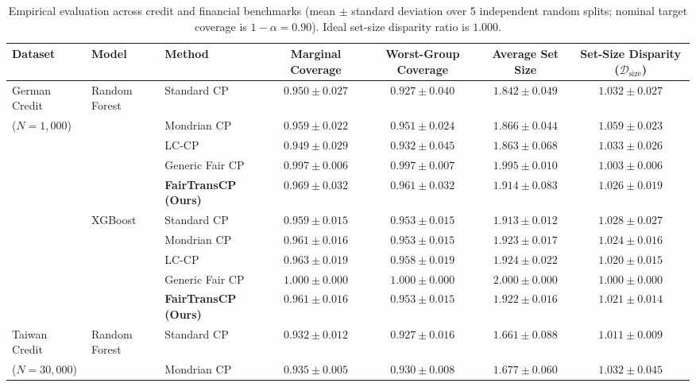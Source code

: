 \documentclass[conference]{IEEEtran}
\begin{document}
\begin{table}[t]
\centering
\caption{Empirical evaluation across credit and financial benchmarks (mean $\pm$ standard deviation over 5 independent random splits; nominal target coverage is $1 - \alpha = 0.90$). Ideal set-size disparity ratio is $1.000$.}
\label{tab:main_results}
\begin{tabular}{lllcccc}
\toprule
\textbf{Dataset} & \textbf{Model} & \textbf{Method} & \textbf{Marginal Coverage} & \textbf{Worst-Group Coverage} & \textbf{Average Set Size} & \textbf{Set-Size Disparity ($\mathcal{D}_{\text{size}}$)} \\
\midrule
German Credit & Random Forest & Standard CP & $0.950 \pm 0.027$ & $0.927 \pm 0.040$ & $1.842 \pm 0.049$ & $1.032 \pm 0.027$ \\
($N=1{,}000$) & & Mondrian CP & $0.959 \pm 0.022$ & $0.951 \pm 0.024$ & $1.866 \pm 0.044$ & $1.059 \pm 0.023$ \\
& & LC-CP & $0.949 \pm 0.029$ & $0.932 \pm 0.045$ & $1.863 \pm 0.068$ & $1.033 \pm 0.026$ \\
& & Generic Fair CP & $0.997 \pm 0.006$ & $0.997 \pm 0.007$ & $1.995 \pm 0.010$ & $\mathbf{1.003 \pm 0.006}$ \\
& & \textbf{FairTransCP (Ours)} & $\mathbf{0.969 \pm 0.032}$ & $\mathbf{0.961 \pm 0.032}$ & $\mathbf{1.914 \pm 0.083}$ & $\mathbf{1.026 \pm 0.019}$ \\
\cmidrule{2-7}
& XGBoost & Standard CP & $0.959 \pm 0.015$ & $0.953 \pm 0.015$ & $1.913 \pm 0.012$ & $1.028 \pm 0.027$ \\
& & Mondrian CP & $0.961 \pm 0.016$ & $0.953 \pm 0.015$ & $1.923 \pm 0.017$ & $1.024 \pm 0.016$ \\
& & LC-CP & $0.963 \pm 0.019$ & $0.958 \pm 0.019$ & $1.924 \pm 0.022$ & $1.020 \pm 0.015$ \\
& & Generic Fair CP & $1.000 \pm 0.000$ & $1.000 \pm 0.000$ & $2.000 \pm 0.000$ & $\mathbf{1.000 \pm 0.000}$ \\
& & \textbf{FairTransCP (Ours)} & $\mathbf{0.961 \pm 0.016}$ & $\mathbf{0.953 \pm 0.015}$ & $\mathbf{1.922 \pm 0.016}$ & $\mathbf{1.021 \pm 0.014}$ \\
\midrule
Taiwan Credit & Random Forest & Standard CP & $0.932 \pm 0.012$ & $0.927 \pm 0.016$ & $1.661 \pm 0.088$ & $1.011 \pm 0.009$ \\
($N=30{,}000$) & & Mondrian CP & $0.935 \pm 0.005$ & $0.930 \pm 0.008$ & $1.677 \pm 0.060$ & $1.032 \pm 0.045$ \\

\end{tabular}
\end{table}
\end{document}
